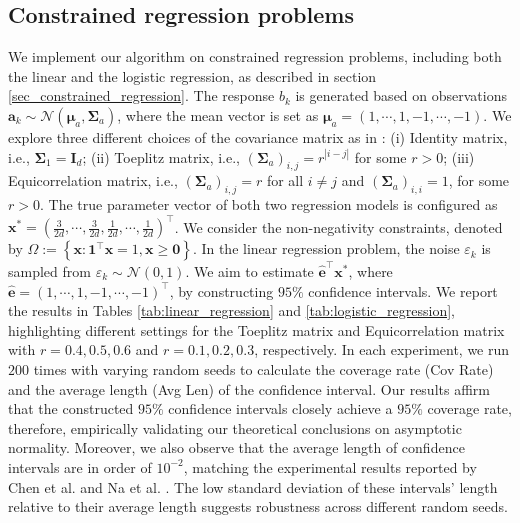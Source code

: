 \documentclass[aos]{imsart}
\numberwithin{equation}{section}
\theoremstyle{plain}
\begin{document}
\subsection{Constrained regression problems}
We implement our algorithm on constrained regression problems, including both the linear and the logistic regression, as described in section \ref{sec_constrained_regression}. The response $b_k$ is generated based on observations $\bm{a}_k \sim \mathcal{N}\left(\bm{\mu}_{a}, \bm{\Sigma}_{a} \right)$, where the mean vector is set as $\bm{\mu}_a = (1, \cdots, 1, -1, \cdots, -1)$. We explore three different choices of the covariance matrix as in \cite{chen2020statistical}: (i) Identity matrix, i.e., $\bm{\Sigma}_1 = \bm{I}_d$; (ii) Toeplitz matrix, i.e., $(\bm{\Sigma}_{a})_{i,j} = r^{|i-j|}$ for some $r > 0$; (iii) Equicorrelation matrix, i.e., $(\bm{\Sigma}_{a})_{i,j} = r$ for all $i \neq j$ and $(\bm{\Sigma}_{a})_{i,i} = 1$, for some $r > 0$. The true parameter vector of both two regression models is configured as $\bm{x}^{*} = \left( \frac{3}{2d}, \cdots, \frac{3}{2d}, \frac{1}{2d}, \cdots, \frac{1}{2d}\right)^{\top}$. We consider the non-negativity constraints, denoted by $\Omega := \left\{\bm{x}: \bm{1}^{\top} \bm{x} = 1, \bm{x} \geq \bm{0}\right\}$. In the linear regression problem, the noise $\varepsilon_k$ is sampled from $\varepsilon_k \sim \mathcal{N}(0,1)$. We aim to estimate $\hat{\bm{e}}^{\top} \bm{x}^{*}$, where $\hat{\bm{e}} = \left(1,\cdots, 1, -1, \cdots, -1 \right)^{\top}$, by constructing $95\%$ confidence intervals. We report the results in Tables \ref{tab:linear_regression} and \ref{tab:logistic_regression}, highlighting different settings for the Toeplitz matrix and Equicorrelation matrix with $r = 0.4, 0.5, 0.6$ and $r=0.1, 0.2, 0.3$, respectively. In each experiment, we run $200$ times with varying random seeds to calculate the coverage rate (Cov Rate) and the average length (Avg Len) of the confidence interval.
Our results affirm that the constructed $95\%$ confidence intervals closely achieve a $95\%$ coverage rate, therefore, empirically validating our theoretical conclusions on asymptotic normality.
Moreover, we also observe that the average length of confidence intervals are in order of $10^{-2}$, matching the experimental results reported by Chen et al. \cite{chen2020statistical} and Na et al. \cite{na2022asymptotic}. The low standard deviation of these intervals' length relative to their average length suggests robustness across different random seeds. 
\end{document}
